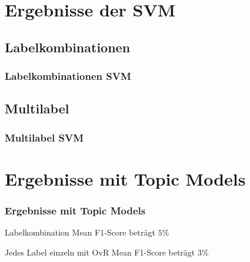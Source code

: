 \documentclass[12pt, xcolor=table]{beamer}
\begin{document}
\section{Ergebnisse der SVM}
\subsection{Labelkombinationen} %
\begin{frame}
    \frametitle{Labelkombinationen SVM}
\end{frame}

\subsection{Multilabel} %
\begin{frame}
    \frametitle{Multilabel SVM}
\end{frame}

\section{Ergebnisse mit Topic Models}
\begin{frame}
    \frametitle{Ergebnisse mit Topic Models}
    \begin{block}{Labelkombination}
        Mean F1-Score beträgt $5 \%$
    \end{block}
    \begin{block}{Jedes Label einzeln mit OvR}
        Mean F1-Score beträgt $3 \%$
    \end{block}
\end{frame}

\end{document}
